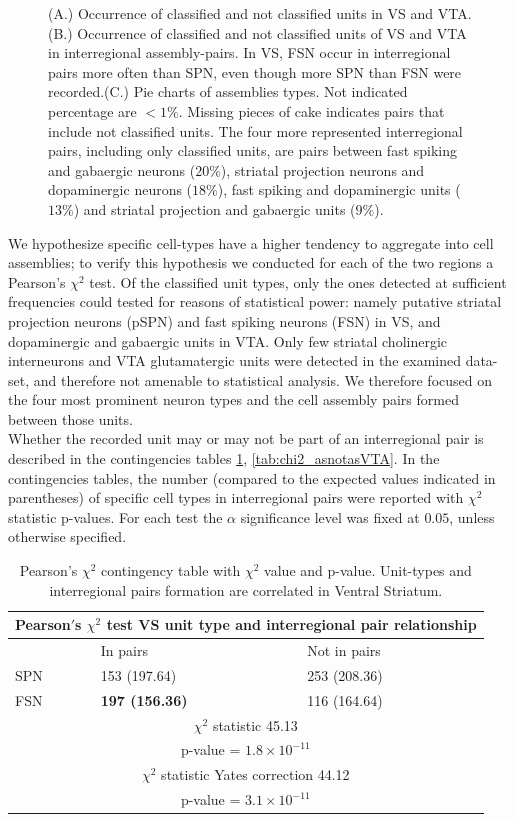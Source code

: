\begin{figure}[H]
    \caption{(A.) Occurrence of classified and not classified units in VS and VTA. (B.) Occurrence of classified and not classified units of VS and VTA in interregional assembly-pairs. In VS, FSN occur in interregional pairs more often than SPN, even though more SPN than FSN were recorded.(C.) Pie charts of assemblies types. Not indicated percentage are $<1\%$. Missing pieces of cake indicates pairs that include not classified units. The four more represented interregional pairs, including only classified units, are pairs between fast spiking and gabaergic neurons ($20\%$), striatal projection neurons and dopaminergic neurons ($18\%$), fast spiking and dopaminergic units ($13\%$) and striatal projection and gabaergic units ($9\%$). }
    \label{fig:PieAssembliesTot}
\end{figure}
We hypothesize specific cell-types have a higher tendency to aggregate into cell assemblies; to verify this hypothesis we conducted for each of the two regions a Pearson's $\chi^2$ test. Of the classified unit types, only the ones detected at sufficient frequencies could tested for reasons of statistical power: namely putative striatal projection neurons (pSPN) and fast spiking neurons (FSN) in VS, and dopaminergic and gabaergic units in VTA. Only few striatal cholinergic interneurons and VTA glutamatergic units were detected in the examined data-set, and therefore not amenable to statistical analysis. We therefore focused on the four most prominent neuron types and the cell assembly pairs formed between those units.\\Whether the recorded unit may or may not be part of an interregional pair is described  in the contingencies tables \ref{tab:chi2_asnotasVS}, \ref{tab:chi2_asnotasVTA}. In the contingencies tables, the number (compared to the expected values indicated in parentheses) of specific cell types in interregional pairs were reported with $\chi^2$ statistic p-values. For each test the $\alpha$ significance level was fixed at $0.05$, unless otherwise specified.
\begin{table}[H]
\begin{tabular}{ |p{3cm}|p{3cm}|p{3cm}| }
 \hline
 \multicolumn{3}{|c|}{Pearson$'$s $\chi^2$ test VS unit type and interregional pair relationship} \\
 \hline
 & In pairs & Not in pairs\\
 \hline
 SPN & 153 (197.64) & 253 (208.36) \\
 \hline
 FSN & \textbf{197 (156.36)} & 116 (164.64)\\
 \hline
 \multicolumn{3}{|c|}{$\chi^2$ statistic  45.13}\\
 \multicolumn{3}{|c|}{p-value = $1.8\times10^{-11}$}\\
 \hline
 \multicolumn{3}{|c|}{$\chi^2$ statistic Yates correction 44.12}\\
 \multicolumn{3}{|c|}{p-value = $3.1\times10^{-11}$}\\
 \hline
\end{tabular}
\caption{Pearson's $\chi^2$ contingency table with $\chi^2$ value and p-value. Unit-types and interregional pairs formation are correlated in Ventral Striatum.}
\label{tab:chi2_asnotasVS}
\end{table}
